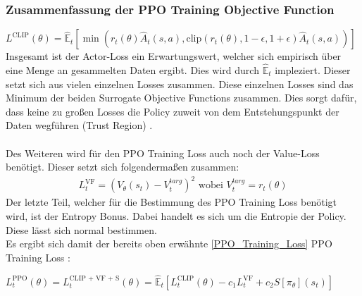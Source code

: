 \subsubsection{Zusammenfassung der PPO Training Objective Function}
$L^\text{CLIP} (\theta) = \mathbb{\hat{E}}_{t} [ \min(r_{t}(\theta) \hat{A}_{t}(s, a), \text{clip}(r_{t}(\theta), 1 - \epsilon, 1 + \epsilon) \hat{A}_{t}(s, a))]$
Insgesamt ist der Actor-Loss ein Erwartungswert, welcher sich empirisch über eine Menge an gesammelten Daten ergibt. Dies wird durch $\mathbb{\hat{E}}_{t}$ impleziert. Dieser setzt sich aus vielen einzelnen Losses zusammen. Diese einzelnen Losses  sind das Minimum der beiden Surrogate Objective Functions zusammen. Dies sorgt dafür, dass keine zu großen Losses die Policy zuweit von dem Entstehungspunkt der Daten wegführen (Trust Region) \cite{PPO}.\\
\\Des Weiteren wird für den PPO Training Loss auch noch der Value-Loss benötigt. Dieser setzt sich folgendermaßen zusammen:
\begin{align}
	L^{\text{VF}}_{t} = (V_{\theta}(s_{t})-V_{t}^{targ})^2 \text{ wobei } V_{t}^{targ} = r_{t}(\theta)
\end{align} 
Der letzte Teil, welcher für die Bestimmung des PPO Training Loss benötigt wird, ist der Entropy Bonus. Dabei handelt es sich um die Entropie der Policy. Diese lässt sich normal bestimmen.\\
Es ergibt sich damit der bereits oben erwähnte \ref{PPO_Training_Loss} PPO Training Loss \cite{PPO}:
\begin{center}
	$L^\text{PPO}_{t} (\theta) = L^\text{CLIP + VF + S}_{t} (\theta) = \mathbb{\hat{E}}_{t} [L^{\text{CLIP}}_{t}(\theta) - c_{1}L^{\text{VF}}_{t} + c_{2}S[\pi_{\theta}](s_{t})]$
\end{center}

